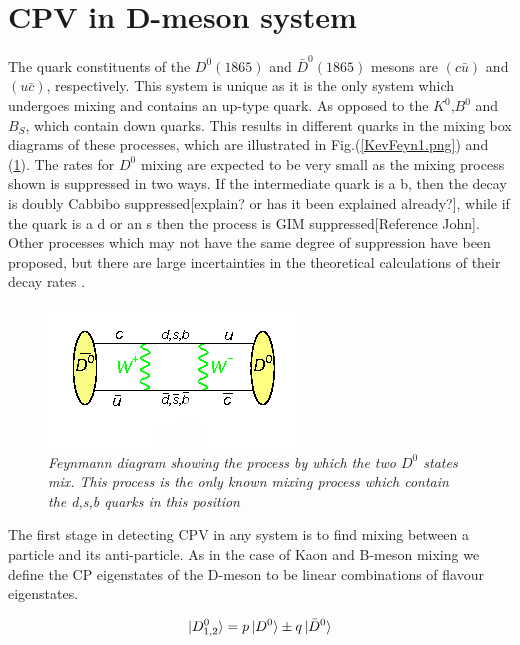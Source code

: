 \section{CPV in D-meson system}

The quark constituents of the $D^{0}(1865)$ and $\bar{D}^{0}(1865)$ mesons are $(c \bar{u})$ and $(u \bar{c})$, respectively. This system is unique as it is the only system which undergoes mixing and contains an up-type quark. As opposed to the $K^{0}$,$B^{0}$ and $B_{S}$, which contain down quarks. This results in different quarks in the mixing box diagrams of these processes, which are illustrated in Fig.(\ref{KevFeyn1.png}) and (\ref{Deon_Mixing_Feyn}). The rates for $D^0$ mixing are expected to be very small as the mixing process shown is suppressed in two ways. If the intermediate quark is a b, then the decay is doubly Cabbibo suppressed[explain? or has it been explained already?], while if the quark is a d or an s then the process is GIM suppressed[Reference John]. Other processes which may not have the same degree of suppression have been proposed, but there are large incertainties in the theoretical calculations of their decay rates \cite{Babar_D0_Review}.    

\begin{figure}[h!]
\begin{center}
\includegraphics[scale=0.8]{figs/Deon_mixing_feyn.png}
\end{center}
\caption{\textit{Feynmann diagram showing the process by which the two $D^{0}$ states mix. This process is the only known mixing process which contain the d,s,b quarks in this position \cite{Deon_Mixing_Feyn}}}
\label{Deon_Mixing_Feyn}
\end{figure}

The first stage in detecting CPV in any system is to find mixing between a particle and its anti-particle. As in the case of Kaon and B-meson mixing we define the CP eigenstates of the D-meson to be linear combinations of flavour eigenstates.

\begin{equation}\label{DeonLinComb}
\ket{D^{0}_{1,2}} = p \ket{D^{0}} \pm q \ket{\bar{D}^{0}}
\end{equation}

